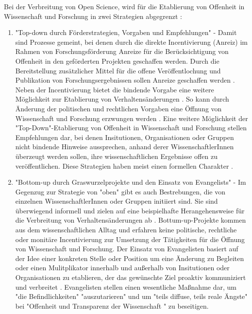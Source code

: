 Bei der Verbreitung von Open Science, wird für die Etablierung von Offenheit in Wissenschaft und Forschung in zwei Strategien abgegrenzt \cite{schulze_2013_open}:
\begin{enumerate}
\item "Top-down durch Förderstrategien, Vorgaben und Empfehlungen" -
Damit sind Prozesse gemeint, bei denen durch die direkte Incentivierung (Anreiz) im Rahmen von Forschungsförderung Anreize für die Berücksichtigung von Offenheit in den geförderten Projekten geschaffen werden. Durch die Bereitstellung zusätzlicher Mittel für die offene Veröffentlochung und Publikation von Forschungsergebnissen sollen Anreize geschaffen werden \cite{suchen}. Neben der Incentivierung bietet die bindende Vorgabe eine weitere Möglichkeit zur Etablierung von Verhaltensänderungen \cite{suchen}. So kann durch Änderung der politischen und rechtlichen Vorgaben eine Öffnung von Wissenschaft und Forschung erzwungen werden \cite{suchen}. Eine weitere Möglichkeit der "Top-Down"-Etablierung von Offenheit in Wissenschaft und Forschung stellen Empfehlungen dar, bei denen Insitutionen, Organisationen oder Gruppen nicht bindende Hinweise aussprechen, anhand derer WissenschaftlerInnen überzeugt werden sollen, ihre wissenschaftlichen Ergebnisse offen zu veröffentlichen. Diese Strategien haben meist einen formellen Charakter \cite{suchen}.
\item "Bottom-up durch Graswurzelprojekte und den Einsatz von Evangelists" -
Im Gegenzug zur Strategie von "oben" gibt es auch Bestrebungen, die von einzelnen WissenschaftlerInnen oder Gruppen initiiert sind. Sie sind überwiegend informell und zielen auf eine beispielhafte Herangehensweise für die Verbreitung von Verhaltensänderungen ab \cite{suchen}. Bottum-up-Projekte kommen aus dem wissenschaftlichen Alltag und erfahren keine politische, rechtliche oder monitäre Incentivierung zur Umsetzung der Tätigkeiten für die Öffnung von Wissenschaft und Forschung. Der Einsatz von Evangelisten basiert auf der Idee einer konkreten Stelle oder Position um eine Änderung zu Begleiten \cite{suchen} oder einen Mulitplikator innerhalb und außerhalb von Insitutionen oder Organisationen zu etablieren, der das gewünschte Ziel proaktiv kommuniziert und verbreitet \cite{suchen}. Evangelisten stellen einen wesentliche Maßnahme dar, um "die Befindlichkeiten" "auszutarieren" und um "teils diffuse, teils reale Ängste" bei "Offenheit und Transparenz der Wissenschaft "\cite{schulze_2013_open} zu beseitigen.
\end{enumerate}

